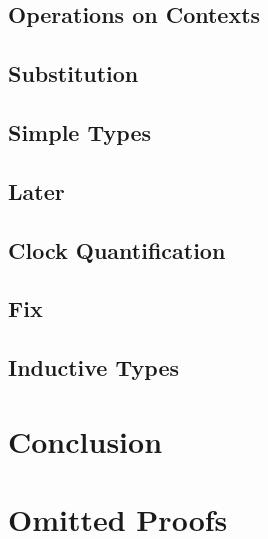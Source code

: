 \documentclass[a4paper,UKenglish]{lipics-v2018}
\begin{document}
\subsection{Operations on Contexts}

\subsection{Substitution}

\subsection{Simple Types}

\subsection{Later}

\subsection{Clock Quantification}

\subsection{Fix}

\subsection{Inductive Types}

\section{Conclusion}

\appendix
\section{Omitted Proofs}





\end{document}

